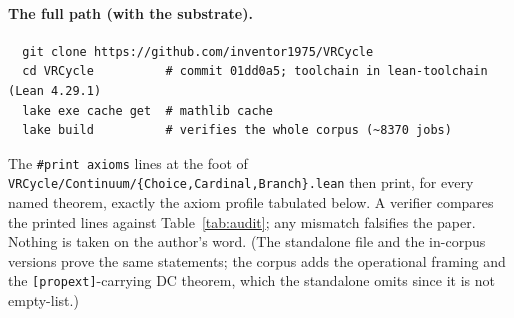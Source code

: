 \documentclass[11pt]{article}
\theoremstyle{remark}
\begin{document}
\paragraph{The full path (with the substrate).}
\begin{verbatim}
  git clone https://github.com/inventor1975/VRCycle
  cd VRCycle          # commit 01dd0a5; toolchain in lean-toolchain (Lean 4.29.1)
  lake exe cache get  # mathlib cache
  lake build          # verifies the whole corpus (~8370 jobs)
\end{verbatim}
The \texttt{\#print axioms} lines at the foot of
\texttt{VRCycle/Continuum/\{Choice,Cardinal,Branch\}.lean} then print,
for every named theorem, exactly the axiom profile tabulated below.  A
verifier compares the printed lines against Table~\ref{tab:audit}; any
mismatch falsifies the paper.  Nothing is taken on the author's word.
(The standalone file and the in-corpus versions prove the same
statements; the corpus adds the operational framing and the
\texttt{[propext]}-carrying DC theorem, which the standalone omits since
it is not empty-list.)
\end{document}
